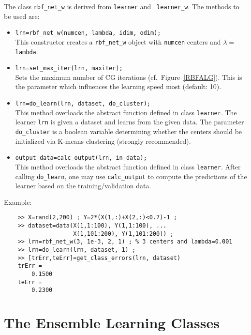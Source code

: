 \documentclass{article}
\begin{document}
The class {\tt rbf\_net\_w} is derived from {\tt learner} and {\tt
  learner\_w}. The methods to be used are:
\begin{itemize}
\item {\tt lrn=rbf\_net\_w(numcen, lambda, idim, odim);}\\
  This constructor creates a {\tt rbf\_net\_w} object with {\tt numcen} centers
  and $\lambda=${\tt lambda}.
\item {\tt lrn=set\_max\_iter(lrn, maxiter);}\\
  Sets the maximum number of CG iterations (cf.~Figure~\ref{RBFALG}). This is
  the parameter which influences the learning speed most (default: 10).
\item {\tt lrn=do\_learn(lrn, dataset, do\_cluster);}\\
  This method overloads the abstract function defined in class {\tt learner}.
  The learner {\tt lrn} is given a dataset and learns from the given data. The
  parameter {\tt do\_cluster} is a boolean variable determining whether the
  centers should be initialized via K-means clustering (strongly recommended).
\item {\tt output\_data=calc\_output(lrn, in\_data);}\\
  This method overloads the abstract function defined in class {\tt learner}.
  After calling {\tt do\_learn}, one may use {\tt calc\_output} to compute the
  predictions of the learner based on the training/validation data.
\end{itemize}
Example:
\begin{verbatim}
    >> X=rand(2,200) ; Y=2*(X(1,:)+X(2,:)<0.7)-1 ;
    >> dataset=data(X(1,1:100), Y(1,1:100), ...
                    X(1,101:200), Y(1,101:200)) ;
    >> lrn=rbf_net_w(3, 1e-3, 2, 1) ; % 3 centers and lambda=0.001
    >> lrn=do_learn(lrn, dataset, 1) ;
    >> [trErr,teErr]=get_class_errors(lrn, dataset)
    trErr =
        0.1500
    teErr =
        0.2300
\end{verbatim}

\section{The Ensemble Learning Classes}
\end{document}
